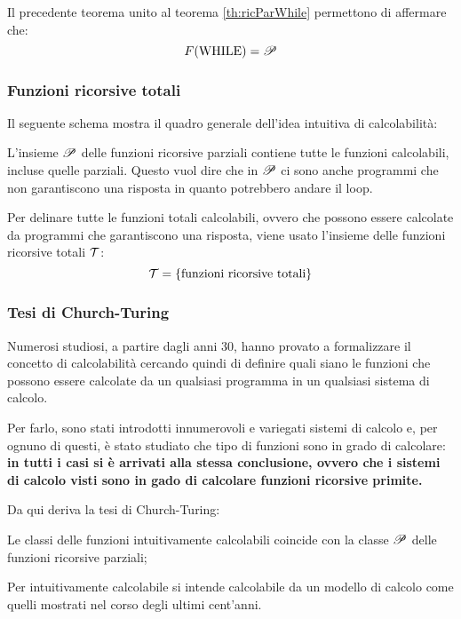 Il precedente teorema unito al teorema \ref{th:ricParWhile} permettono di affermare che:
$$ F(\text{WHILE}) = \mathscr{P} $$

\subsubsection{Funzioni ricorsive totali}
Il seguente schema mostra il quadro generale dell'idea intuitiva di calcolabilità:
\vspace{1em}
\begin{center}
    
\end{center}

L'insieme $\mathscr{P}$ delle funzioni ricorsive parziali contiene tutte le funzioni
calcolabili, incluse quelle parziali. Questo vuol dire che in $\mathscr{P}$ ci sono anche
programmi che non garantiscono una risposta in quanto potrebbero andare il loop.

Per delinare tutte le funzioni totali calcolabili, ovvero che possono essere calcolate
da programmi che garantiscono una risposta, viene usato l'insieme delle funzioni
ricorsive totali $\mathcal{T}$:
$$\mathcal{T} = \{\text{funzioni ricorsive totali}\} $$
\vspace{.1em}
\begin{center}
    
\end{center}
\vspace{.5em}

\subsubsection{Tesi di Church-Turing}
Numerosi studiosi, a partire dagli anni 30, hanno provato a formalizzare il concetto di
calcolabilità cercando quindi di definire quali siano le funzioni che possono essere
calcolate da un qualsiasi programma in un qualsiasi sistema di calcolo.

Per farlo, sono stati introdotti innumerovoli e variegati sistemi di calcolo e, per
ognuno di questi, è stato studiato che tipo di funzioni sono in grado di calcolare:
\textbf{in tutti i casi si è arrivati alla stessa conclusione, ovvero che i sistemi
di calcolo visti sono in gado di calcolare funzioni ricorsive primite.}

Da qui deriva la tesi di Church-Turing:
\begin{center}
    \begin{minipage}{.9\textwidth}
        \begin{tcolorbox}[colback=white,sharp corners,boxrule=.2mm]
            Le classi delle funzioni intuitivamente calcolabili coincide con la classe 
            $\mathscr{P}$ delle funzioni ricorsive parziali;
        \end{tcolorbox}
    \end{minipage}
\end{center}
Per intuitivamente calcolabile si intende calcolabile da un modello di calcolo
 come quelli mostrati nel corso degli ultimi cent'anni.

